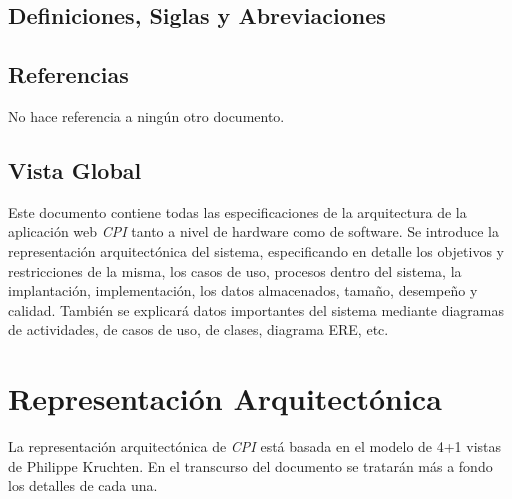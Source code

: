 \documentclass{article}
\begin{document}
    \subsection{Definiciones, Siglas y Abreviaciones}

    \subsection{Referencias}
    No hace referencia a ningún otro documento.

    \subsection{Vista Global}
    Este documento contiene todas las especificaciones de la arquitectura de la aplicación web \emph{CPI} tanto a nivel de hardware como de software. Se introduce la representación arquitectónica del sistema, especificando en detalle los objetivos y restricciones de la misma, los casos de uso, procesos dentro del sistema, la implantación, implementación, los datos almacenados, tamaño, desempeño y calidad. También se explicará datos importantes del sistema mediante diagramas de actividades, de casos de uso, de clases, diagrama ERE, etc.

    \vskip 1.5cm
    \section{Representación Arquitectónica} \label{reprArq}
    La representación arquitectónica de \emph{CPI} está basada en el modelo de 4+1 vistas de Philippe Kruchten. En el transcurso del documento se tratarán más a fondo los detalles de cada una.
    
    
    
    
    
    
    
    
\end{document}
